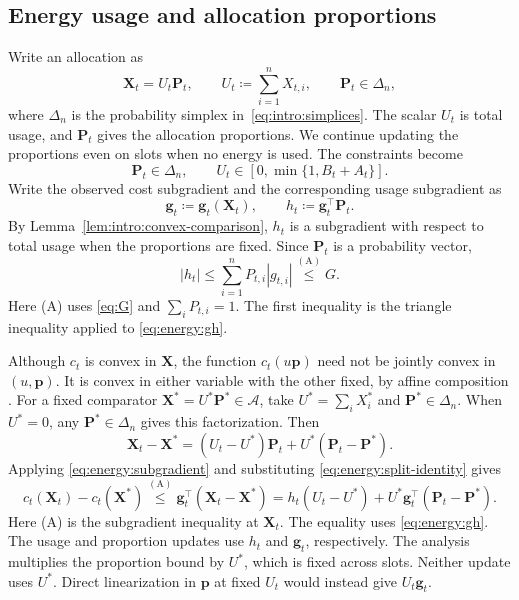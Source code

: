 \subsection{Energy usage and allocation proportions}

Write an allocation as
\begin{equation}\label{eq:energy:decomposition}
\mathbf{X}_t=U_t\mathbf{P}_t,\qquad
U_t\coloneqq\sum_{i=1}^n X_{t,i},\qquad \mathbf{P}_t\in\Delta_n,
\end{equation}
where $\Delta_n$ is the probability simplex in~\eqref{eq:intro:simplices}.
The scalar $U_t$ is total usage, and $\mathbf P_t$ gives the allocation
proportions.
We continue updating the proportions even on slots when no energy is used.
The constraints become
\[
\mathbf P_t\in\Delta_n,\qquad
U_t\in[0,\min\{1,B_t+A_t\}].
\]
Write the observed cost subgradient and the corresponding usage subgradient as
\begin{equation}\label{eq:energy:gh}
\mathbf g_t\coloneqq\mathbf g_t(\mathbf X_t),\qquad
h_t\coloneqq\mathbf g_t^\top\mathbf P_t.
\end{equation}
By Lemma~\ref{lem:intro:convex-comparison}, $h_t$ is a subgradient with
respect to total usage when the proportions are fixed.
Since $\mathbf P_t$ is a probability vector,
\begin{equation}\label{eq:energy:h-bound}
|h_t|\leq\sum_{i=1}^nP_{t,i}|g_{t,i}|
\overset{\mathrm{(A)}}{\leq}G.
\end{equation}
Here (A) uses \eqref{eq:G} and $\sum_iP_{t,i}=1$. The first inequality
is the triangle inequality applied to \eqref{eq:energy:gh}.

Although $c_t$ is convex in $\mathbf X$, the function $c_t(u\mathbf p)$
need not be jointly convex in $(u,\mathbf p)$. It is convex in either
variable with the other fixed, by affine composition
\cite[Section~3.2.2]{boyd_vandenberghe_2004}.
For a fixed comparator $\mathbf X^*=U^*\mathbf P^*\in\mathcal A$, take
$U^*=\sum_iX_i^*$ and $\mathbf P^*\in\Delta_n$. When $U^*=0$,
any $\mathbf P^*\in\Delta_n$ gives this factorization. Then
\begin{equation}\label{eq:energy:split-identity}
\mathbf X_t-\mathbf X^*
=(U_t-U^*)\mathbf P_t+U^*(\mathbf P_t-\mathbf P^*).
\end{equation}
Applying \eqref{eq:energy:subgradient} and substituting
\eqref{eq:energy:split-identity} gives
\begin{equation}\label{eq:energy:split-bound}
 c_t(\mathbf X_t)-c_t(\mathbf X^*) \overset{\mathrm{(A)}}{\leq}\mathbf g_t^\top(\mathbf X_t-\mathbf
   X^*) =h_t(U_t-U^*)+U^*\mathbf g_t^\top(\mathbf P_t-\mathbf P^*).
\end{equation}
Here (A) is the subgradient inequality at $\mathbf X_t$. The equality
uses \eqref{eq:energy:gh}. The usage and proportion updates use $h_t$
and $\mathbf g_t$, respectively. The analysis multiplies the proportion
bound by $U^*$, which is fixed across slots. Neither update uses $U^*$.
Direct linearization in $\mathbf p$ at fixed $U_t$ would instead give
$U_t\mathbf g_t$.

